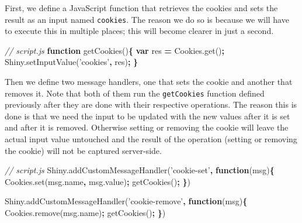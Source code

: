 \documentclass[10pt,]{krantz}
\makeatletter
\newenvironment{Shaded}{\begin{snugshade}}{\end{snugshade}}
\newcommand{\AttributeTok}[1]{\textcolor[rgb]{0.61,0.61,0.61}{#1}}
\newcommand{\CommentTok}[1]{\textcolor[rgb]{0.37,0.37,0.37}{\textit{#1}}}
\newcommand{\KeywordTok}[1]{\textcolor[rgb]{0.27,0.27,0.27}{\textbf{#1}}}
\newcommand{\NormalTok}[1]{#1}
\newcommand{\OperatorTok}[1]{\textcolor[rgb]{0.43,0.43,0.43}{\textbf{#1}}}
\newcommand{\StringTok}[1]{\textcolor[rgb]{0.5,0.5,0.5}{#1}}
\newcommand{\VariableTok}[1]{\textcolor[rgb]{0,0,0}{#1}}
\newenvironment{kframe}{%
\medskip{}
\setlength{\fboxsep}{.8em}
 \def\at@end@of@kframe{}%
 \ifinner\ifhmode%
  \def\at@end@of@kframe{\end{minipage}}%
  \begin{minipage}{\columnwidth}%
 \fi\fi%
 \def\FrameCommand##1{\hskip\@totalleftmargin \hskip-\fboxsep
 \colorbox{shadecolor}{##1}\hskip-\fboxsep
     \hskip-\linewidth \hskip-\@totalleftmargin \hskip\columnwidth}%
 \MakeFramed {\advance\hsize-\width
   \@totalleftmargin\z@ \linewidth\hsize
   \@setminipage}}%
 {\par\unskip\endMakeFramed%
 \at@end@of@kframe}
\renewenvironment{Shaded}{\begin{kframe}}{\end{kframe}}
\makeatother
\begin{document}
First, we define a JavaScript function that retrieves the cookies and sets the result as an input named \texttt{cookies}. The reason we do so is because we will have to execute this in multiple places; this will become clearer in just a second.

\begin{Shaded}
\begin{Highlighting}[]
\CommentTok{// script.js}
\KeywordTok{function} \AttributeTok{getCookies}\NormalTok{()}\OperatorTok{\{}
  \KeywordTok{var}\NormalTok{ res }\OperatorTok{=} \VariableTok{Cookies}\NormalTok{.}\AttributeTok{get}\NormalTok{()}\OperatorTok{;}
  \VariableTok{Shiny}\NormalTok{.}\AttributeTok{setInputValue}\NormalTok{(}\StringTok{'cookies'}\OperatorTok{,}\NormalTok{ res)}\OperatorTok{;}
\OperatorTok{\}}
\end{Highlighting}
\end{Shaded}

Then we define two message handlers, one that sets the cookie and another that removes it. Note that both of them run the \texttt{getCookies} function defined previously after they are done with their respective operations. The reason this is done is that we need the input to be updated with the new values after it is set and after it is removed. Otherwise setting or removing the cookie will leave the actual input value untouched and the result of the operation (setting or removing the cookie) will not be captured server-side.

\begin{Shaded}
\begin{Highlighting}[]
\CommentTok{// script.js}
\VariableTok{Shiny}\NormalTok{.}\AttributeTok{addCustomMessageHandler}\NormalTok{(}\StringTok{'cookie-set'}\OperatorTok{,} \KeywordTok{function}\NormalTok{(msg)}\OperatorTok{\{}
  \VariableTok{Cookies}\NormalTok{.}\AttributeTok{set}\NormalTok{(}\VariableTok{msg}\NormalTok{.}\AttributeTok{name}\OperatorTok{,} \VariableTok{msg}\NormalTok{.}\AttributeTok{value}\NormalTok{)}\OperatorTok{;}
  \AttributeTok{getCookies}\NormalTok{()}\OperatorTok{;}
\OperatorTok{\}}\NormalTok{)}

\VariableTok{Shiny}\NormalTok{.}\AttributeTok{addCustomMessageHandler}\NormalTok{(}\StringTok{'cookie-remove'}\OperatorTok{,} \KeywordTok{function}\NormalTok{(msg)}\OperatorTok{\{}
  \VariableTok{Cookies}\NormalTok{.}\AttributeTok{remove}\NormalTok{(}\VariableTok{msg}\NormalTok{.}\AttributeTok{name}\NormalTok{)}\OperatorTok{;}
  \AttributeTok{getCookies}\NormalTok{()}\OperatorTok{;}
\OperatorTok{\}}\NormalTok{)}
\end{Highlighting}
\end{Shaded}
\end{document}
